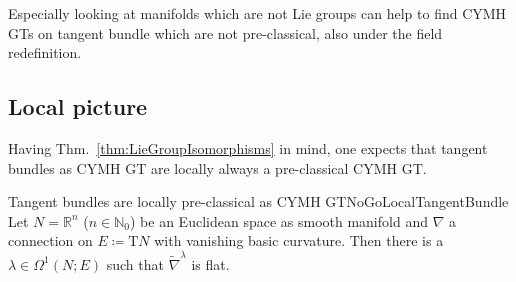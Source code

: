 Especially looking at manifolds which are not Lie groups can help to find CYMH GTs on tangent bundle which are not pre-classical, also under the field redefinition.

\subsection{Local picture}\label{LocalTangentBundles}

Having Thm.~\ref{thm:LieGroupIsomorphisms} in mind, one expects that tangent bundles as CYMH GT are locally always a pre-classical CYMH GT.

\begin{theorems}{Tangent bundles are locally pre-classical as CYMH GT}{NoGoLocalTangentBundle}
Let $N = \mathbb{R}^n$ ($n \in \mathbb{N}_0$) be an Euclidean space as smooth manifold and $\nabla$ a connection on $E \coloneqq \mathrm{T}N$ with vanishing basic curvature. Then there is a $\lambda \in \Omega^1(N;E)$ such that $\widetilde{\nabla}^\lambda$ is flat.
\end{theorems}

